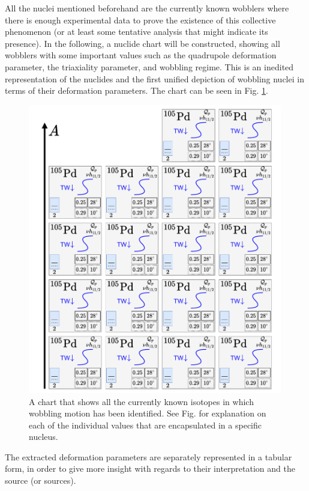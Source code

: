 All the nuclei mentioned beforehand are the currently known wobblers where there is enough experimental data to prove the existence of this collective phenomenon (or at least some tentative analysis that might indicate its presence). In the following, a nuclide chart will be constructed, showing all wobblers with some important values such as the quadrupole deformation parameter, the triaxiality parameter, and wobbling regime. This is an inedited representation of the nuclides and the first unified depiction of wobbling nuclei in terms of their deformation parameters. The chart can be seen in Fig. \ref{wobblers-diagram-chart}.
\begin{figure}
    \centering
    \includegraphics[width=0.99\textwidth]{Chapters/Figures/wobblers-chart.pdf}
    \caption{A chart that shows all the currently known isotopes in which wobbling motion has been identified. See Fig. for explanation on each of the individual values that are encapsulated in a specific nucleus.}
    \label{wobblers-diagram-chart}
\end{figure}

The extracted deformation parameters are separately represented in a tabular form, in order to give more insight with regards to their interpretation and the source (or sources).